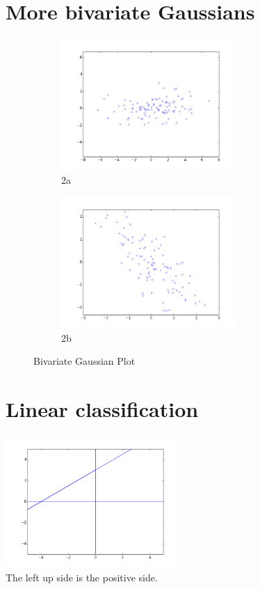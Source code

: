 \documentclass{article}
\begin{document}
\section{More bivariate Gaussians}

\begin{figure}[h]
 
\begin{subfigure}{0.5\textwidth}
\includegraphics[width=0.9\linewidth, height=5cm]{2a} 
\caption{2a}
\label{fig:2a}
\end{subfigure}
\begin{subfigure}{0.5\textwidth}
\includegraphics[width=0.9\linewidth, height=5cm]{2b}
\caption{2b}
\label{fig:2b}
\end{subfigure}
 
\caption{Bivariate Gaussian Plot}
\label{fig:plots}
\end{figure}

\section{Linear classification}
\includegraphics[width=0.5\textwidth]{3}\\
The left up side is the positive side.
\end{document}
